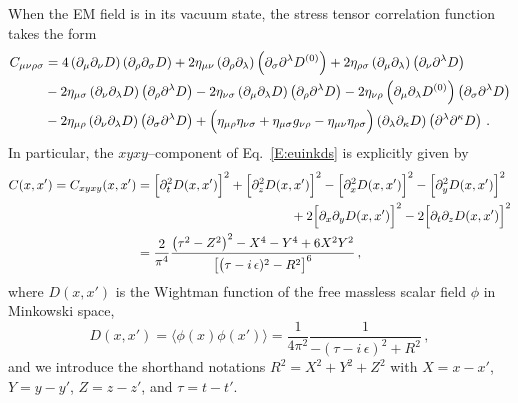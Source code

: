 \documentclass[preprint,prd,showpacs,superscriptaddress]{revtex4}
\begin{document}
When the EM field is in its vacuum state, the stress tensor correlation function takes the form~\cite{FW03}
\begin{align}
	C_{\mu\nu\rho\sigma}&=4\left(\partial_{\mu}\partial_{\nu}D\right)\left(\partial_{\rho}\partial_{\sigma}D\right)+
	2\eta_{\mu\nu}\left(\partial_{\rho}\partial_{\lambda}\right)\left(\partial_{\sigma}\partial^{\lambda}D^{(0)}\right)+
	2\eta_{\rho\sigma}\left(\partial_{\mu}\partial_{\lambda}\right)\left(\partial_{\nu}\partial^{\lambda}D\right)\notag\\
	&-2\eta_{\mu\sigma}\left(\partial_{\nu}\partial_{\lambda}D\right)\left(\partial_{\rho}\partial^{\lambda}D\right)-
	2\eta_{\nu\sigma}\left(\partial_{\mu}\partial_{\lambda}D\right)\left(\partial_{\rho}\partial^{\lambda}D\right)-
	2\eta_{\nu\rho}\left(\partial_{\mu}\partial_{\lambda}D^{(0)}\right)\left(\partial_{\sigma}\partial^{\lambda}D\right)\notag\\
	&-2\eta_{\mu\rho}\left(\partial_{\nu}\partial_{\lambda}D\right)\left(\partial_{\sigma}\partial^{\lambda}D\right)+
	\Bigl(\eta_{\mu\rho}\eta_{\nu\sigma}+\eta_{\mu\sigma}g_{\nu\rho}-
	\eta_{\mu\nu}\eta_{\rho\sigma}\Bigr)\left(\partial_{\lambda}\partial_{\kappa}D\right)\left(\partial^{\lambda}\partial^{\kappa}D\right)\,.
	\label{E:euinkds}
\end{align}
In particular, the $xyxy$--component of Eq.~\eqref{E:euinkds} is explicitly given by
\begin{align}
	C(x,x')=C_{xyxy}(x,x')&=\Bigl[\partial_{t}^{2}D(x,x')\Bigr]^{2}+\Bigl[\partial_{z}^{2}D(x,x')\Bigr]^{2}-
	\Bigl[\partial_{x}^{2}D(x,x')\Bigr]^{2}-\Bigl[\partial_{y}^{2}D(x,x')\Bigr]^{2}\notag\\
	&\qquad\qquad\qquad\qquad\qquad\qquad+2\Bigl[\partial_{x}\partial_{y}D(x,x')\Bigr]^{2}-2\Bigl[\partial_{t}\partial_{z}D(x,x')\Bigr]^{2}\notag\\
	&=\frac{2}{\pi^{4}}\frac{\bigl(\tau^{2}-Z^{2}\bigr)^{2}-X^{4}-Y^{4}+6X^{2}Y^{2}}{\bigl[\bigl(\tau-i\,\epsilon)^{2}-R^{2}\bigr]^{6}}\,,
\end{align}
where $D(x,x')$ is the Wightman function of the free massless scalar field $\phi$ in Minkowski space,
\begin{equation}
	D(x,x')=\langle\phi(x)\phi(x')\rangle=\frac{1}{4\pi^{2}}\frac{1}{-(\tau-i\,\epsilon)^{2}+R^{2}}\,,
	\label{E:Wightman}
\end{equation}
and we introduce the shorthand notations $R^{2}=X^{2}+Y^{2}+Z^{2}$ with $X=x-x'$, $Y=y-y'$,  $Z=z-z'$, and $\tau=t-t'$.
\end{document}
